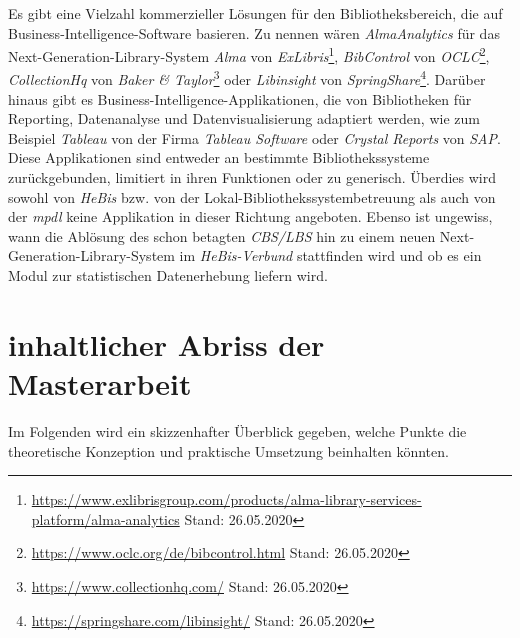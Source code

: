 \documentclass[10pt,a4paper,twocolumn,report]{IEEEtran}
\begin{document}
Es gibt eine Vielzahl kommerzieller Lösungen für den Bibliotheksbereich, die auf Business-Intelligence-Software basieren.
Zu nennen wären \textit{AlmaAnalytics} für das
Next-Generation-Library-System \textit{Alma} von \textit{ExLibris}\footnote{\url{https://www.exlibrisgroup.com/products/alma-library-services-platform/alma-analytics}
Stand: 26.05.2020}, \textit{BibControl} von \textit{OCLC}\footnote{\url{https://www.oclc.org/de/bibcontrol.html} Stand: 26.05.2020},
\textit{CollectionHq} von \textit{Baker \& Taylor}\footnote{\url{https://www.collectionhq.com/} Stand: 26.05.2020} oder \textit{Libinsight} von \textit{SpringShare}\footnote{\url{https://springshare.com/libinsight/} Stand: 26.05.2020}.
Darüber hinaus gibt es Business-Intelligence-Applikationen, die von
Bibliotheken für Reporting, Datenanalyse und Datenvisualisierung adaptiert werden,
wie zum Beispiel \textit{Tableau} von der Firma \textit{Tableau Software} oder
\textit{Crystal Reports} von \textit{SAP}.
Diese Applikationen sind entweder
an bestimmte Bibliothekssysteme zurückgebunden, limitiert in ihren
Funktionen\cite{RN47} oder zu generisch.
Überdies wird sowohl von \textit{HeBis} bzw. von der
Lokal-Bibliothekssystembetreuung als auch von der \textit{mpdl} keine Applikation
in dieser Richtung angeboten.
Ebenso ist ungewiss, wann die Ablösung des schon betagten \textit{CBS/LBS} hin zu
einem neuen Next-Generation-Library-System im \textit{HeBis-Verbund} stattfinden wird und ob
es ein Modul zur statistischen Datenerhebung liefern wird.

\section{inhaltlicher Abriss der Masterarbeit}
Im Folgenden wird ein skizzenhafter Überblick gegeben, welche Punkte die
theoretische Konzeption und praktische Umsetzung beinhalten könnten.\\
\end{document}
